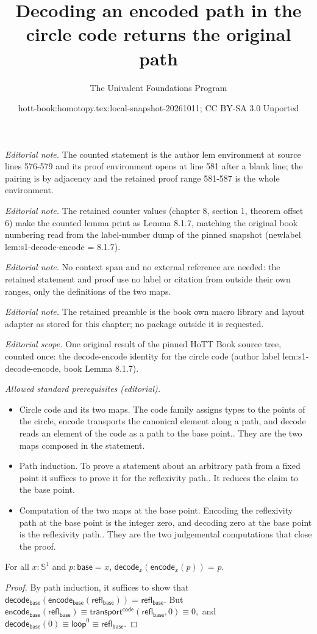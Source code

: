 \documentclass[10pt,a4paper]{article}
\title{Decoding an encoded path in the circle code returns the original path}
\author{The Univalent Foundations Program}
\date{hott-book:homotopy.tex:local-snapshot-20261011; CC BY-SA 3.0 Unported}
\newcounter{chapter}
\newcommand{\jdeq}{\equiv}      %
\newcommand{\id}[3][]{\ensuremath{#2 =_{#1} #3}\xspace}
\newcommand{\refl}[1]{\ensuremath{\mathsf{refl}_{#1}}\xspace}
\newcommand{\transfib}[3]{\ensuremath{\mathsf{transport}^{#1}(#2,#3)\xspace}}
\newcommand{\Sn}{\mathbb{S}}
\newcommand{\base}{\ensuremath{\mathsf{base}}\xspace}
\newcommand{\lloop}{\ensuremath{\mathsf{loop}}\xspace}
\newcommand{\code}{\ensuremath{\mathsf{code}}\xspace}
\newcommand{\encode}{\ensuremath{\mathsf{encode}}\xspace}
\newcommand{\decode}{\ensuremath{\mathsf{decode}}\xspace}
\theoremstyle{definition}
\theoremstyle{remark}
\numberwithin{equation}{section}
\newcommand{\narrowequation}[1]{$#1$}
\begin{document}
\maketitle
\setcounter{chapter}{8}
\setcounter{section}{1}
\setcounter{thm}{6}
\noindent\textit{Editorial note.} The counted statement is the author lem environment at source lines 576-579 and its proof environment opens at line 581 after a blank line; the pairing is by adjacency and the retained proof range 581-587 is the whole environment.\par\medskip
\noindent\textit{Editorial note.} The retained counter values (chapter 8, section 1, theorem offset 6) make the counted lemma print as Lemma 8.1.7, matching the original book numbering read from the label-number dump of the pinned snapshot (newlabel lem:s1-decode-encode = 8.1.7).\par\medskip
\noindent\textit{Editorial note.} No context span and no external reference are needed: the retained statement and proof use no label or citation from outside their own ranges, only the definitions of the two maps.\par\medskip
\noindent\textit{Editorial note.} The retained preamble is the book own macro library and layout adapter as stored for this chapter; no package outside it is requested.\par\medskip
\noindent\textit{Editorial scope.} One original result of the pinned HoTT Book source tree, counted once: the decode-encode identity for the circle code (author label lem:s1-decode-encode, book Lemma 8.1.7).\par\medskip
\noindent\textit{Allowed standard prerequisites (editorial).}\begin{itemize}
\item Circle code and its two maps. The code family assigns types to the points of the circle, encode transports the canonical element along a path, and decode reads an element of the code as a path to the base point.. They are the two maps composed in the statement.
\item Path induction. To prove a statement about an arbitrary path from a fixed point it suffices to prove it for the reflexivity path.. It reduces the claim to the base point.
\item Computation of the two maps at the base point. Encoding the reflexivity path at the base point is the integer zero, and decoding zero at the base point is the reflexivity path.. They are the two judgemental computations that close the proof.
\end{itemize}\medskip
\begin{lem} \label{lem:s1-decode-encode}
For all $x: \Sn ^1$ and $p : \id \base x$, $\id
{\decode_x({{\encode_x(p)}})} p$.
\end{lem}

\begin{proof}
By path induction, it suffices to show that
\narrowequation{\id {\decode_{\base}({{\encode_{\base}(\refl{\base})}})} {\refl{\base}}.}
But
\narrowequation{\encode_{\base}(\refl{\base}) \jdeq \transfib{\code}{\refl{\base}} 0 \jdeq 0,}
and $\decode_{\base}(0) \jdeq \lloop^ 0 \jdeq \refl{\base}$.
\end{proof}
\end{document}
